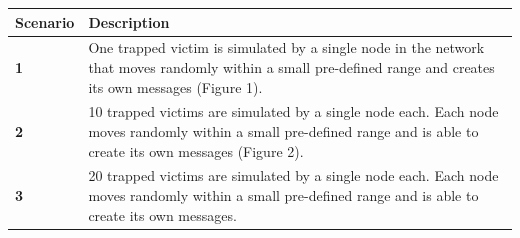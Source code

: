 \documentclass{article}
\begin{document}
\begin{center}
\begin{tabular}{|l|p{13cm}|}
\hline
\textbf{Scenario} & \textbf{Description} \\ \hline
\textbf{1} & One trapped victim is simulated by a single node in the network that moves randomly within a small pre-defined range and creates its own messages (Figure 1). \\ \hline
\textbf{2} & 10 trapped victims are simulated by a single node each. Each node moves randomly within a small pre-defined range and is able to create its own messages (Figure 2). \\ \hline
\textbf{3} & 20 trapped victims are simulated by a single node each. Each node moves randomly within a small pre-defined range and is able to create its own messages. \\ \hline
\end{tabular}
\end{center}
\end{document}
